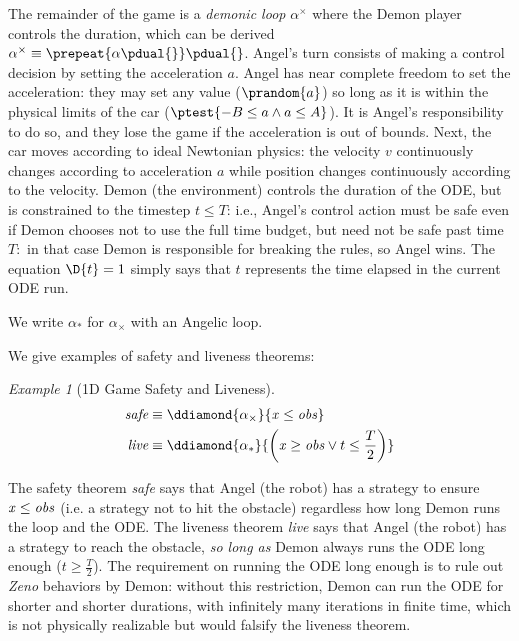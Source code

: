 \documentclass[12pt]{cmuthesis}
\theoremstyle{definition}
\theoremstyle{remark}
\newtheorem{example}{Example}
\begin{document}
The remainder of the game is a \emph{demonic loop} $\alpha^\times$ where the Demon player controls the duration, which can be derived $\alpha^\times \equiv {\prepeat{{\alpha{}\pdual{}}}}{\pdual{}}$.
Angel's turn consists of making a control decision by setting the acceleration $a$.
Angel has near complete freedom to set the acceleration: they may set any value ($\prandom{a}$) so long as it is within the physical limits of the car ($\ptest{-B \leq a \land a \leq A}$).
It is Angel's responsibility to do so, and they lose the game if the acceleration is out of bounds.
Next, the car moves according to ideal Newtonian physics: the velocity $v$ continuously changes according to acceleration $a$ while position changes continuously according to the velocity.
Demon (the environment) controls the duration of the ODE, but is constrained to the timestep $t \leq T$: i.e., Angel's control action must be safe even if Demon chooses not to use the full time budget, but need not be safe past time $T:$ in that case Demon is responsible for breaking the rules, so Angel wins.
The equation $\D{t}=1$ simply says that $t$ represents the time elapsed in the current ODE run.

We write $\alpha_*$ for $\alpha_\times$ with an Angelic loop.

We give examples of safety and liveness theorems:
\begin{example}[1D Game Safety and Liveness]
  \begin{align*}
    \textit{safe} &\equiv \ddiamond{\alpha_\times}{\xvar \leq \obsvar}\\
    \textit{live} &\equiv \ddiamond{\alpha_*}{\left(\xvar \geq \obsvar \lor t \leq \frac{T}{2}\right)}
  \end{align*}
\end{example}
The safety theorem \emph{safe} says that Angel (the robot) has a strategy to ensure ${\it x} \leq {\it obs}$ (i.e. a strategy not to hit the obstacle) regardless how long Demon runs the loop and the ODE.
The liveness theorem \emph{live} says that Angel (the robot) has a strategy to reach the obstacle, \emph{so long as} Demon always runs the ODE long enough ($t \geq \frac{T}{2}$).
The requirement on running the ODE long enough is to rule out \emph{Zeno} behaviors by Demon: without this restriction, Demon can run the ODE for shorter and shorter durations, with infinitely many iterations in finite time, which is not physically realizable but would falsify the liveness theorem.
\end{document}
